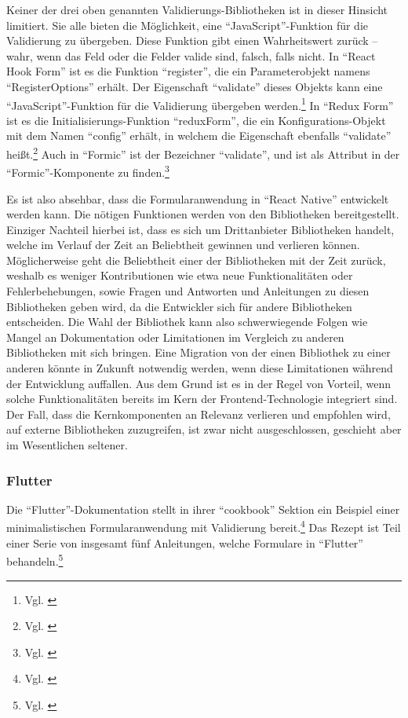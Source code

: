 Keiner der drei oben genannten Validierungs-Bibliotheken ist in dieser Hinsicht limitiert.
Sie alle bieten die Möglichkeit, eine \enquote{JavaScript}-Funktion für die Validierung zu übergeben.
Diese Funktion gibt einen Wahrheitswert zurück -- wahr, wenn das Feld oder die Felder valide sind, falsch, falls nicht.
In \enquote{React Hook Form} ist es die Funktion \enquote{register}, die ein Parameterobjekt namens \enquote{RegisterOptions} erhält.
Der Eigenschaft \enquote{validate} dieses Objekts kann eine \enquote{JavaScript}-Funktion für die Validierung übergeben werden.\footnote{Vgl. \cite{RegisterReactHookFormAPI}}
In \enquote{Redux Form} ist es die Initialisierungs-Funktion \enquote{reduxForm}, die ein Konfigurations-Objekt mit dem Namen \enquote{config} erhält, in welchem die Eigenschaft ebenfalls \enquote{validate} heißt.\footnote{Vgl. \cite{ReduxFormReduxFormAPI}}
Auch in \enquote{Formic} ist der Bezeichner \enquote{validate}, und ist als Attribut in der \enquote{Formic}-Komponente  zu finden.\footnote{Vgl. \cite{FormikComponentFormikDocsAPI}}


Es ist also absehbar, dass die Formularanwendung in \enquote{React Native} entwickelt werden kann.
Die nötigen Funktionen werden von den Bibliotheken bereitgestellt.
Einziger Nachteil hierbei ist, dass es sich um Drittanbieter Bibliotheken handelt, welche im Verlauf der Zeit an Beliebtheit gewinnen und verlieren können.
Möglicherweise geht die Beliebtheit einer der Bibliotheken mit der Zeit zurück, weshalb es weniger Kontributionen wie etwa neue Funktionalitäten oder Fehlerbehebungen,
sowie Fragen und Antworten und Anleitungen zu diesen Bibliotheken geben wird, da die Entwickler sich für andere Bibliotheken entscheiden.
Die Wahl der Bibliothek kann also schwerwiegende Folgen wie Mangel an Dokumentation oder Limitationen im Vergleich zu anderen Bibliotheken mit sich bringen.
Eine Migration von der einen Bibliothek zu einer anderen könnte in Zukunft notwendig werden, wenn diese Limitationen während der Entwicklung auffallen.
Aus dem Grund ist es in der Regel von Vorteil, wenn solche Funktionalitäten bereits im Kern der Frontend-Technologie integriert sind.
Der Fall, dass die Kernkomponenten an Relevanz verlieren und empfohlen wird, auf externe Bibliotheken zuzugreifen, ist zwar nicht ausgeschlossen, geschieht aber im Wesentlichen seltener.


\subsubsection{Flutter}
Die \enquote{Flutter}-Dokumentation stellt in ihrer \enquote{cookbook} Sektion ein Beispiel einer minimalistischen Formularanwendung mit Validierung bereit.\footnote{Vgl. \cite{BuildAFormWithValidation}}
Das Rezept ist Teil einer Serie von insgesamt fünf Anleitungen, welche Formulare in \enquote{Flutter} behandeln.\footnote{Vgl. \cite{FormsFlutter}}

